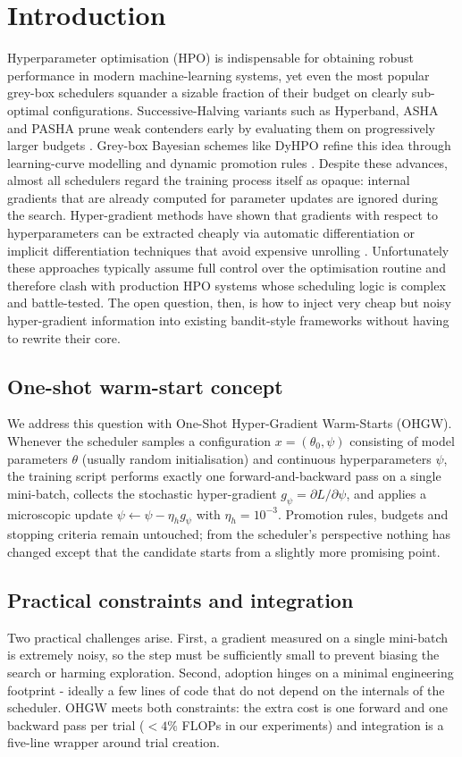 \documentclass{article}
\begin{document}
\section{Introduction}
Hyperparameter optimisation (HPO) is indispensable for obtaining robust performance in modern machine-learning systems, yet even the most popular grey-box schedulers squander a sizable fraction of their budget on clearly sub-optimal configurations. Successive-Halving variants such as Hyperband, ASHA and PASHA prune weak contenders early by evaluating them on progressively larger budgets \cite{bohdal-2022-pasha}. Grey-box Bayesian schemes like DyHPO refine this idea through learning-curve modelling and dynamic promotion rules \cite{wistuba-2022-supervising}. Despite these advances, almost all schedulers regard the training process itself as opaque: internal gradients that are already computed for parameter updates are ignored during the search. Hyper-gradient methods have shown that gradients with respect to hyperparameters can be extracted cheaply via automatic differentiation \cite{chandra-2019-gradient} or implicit differentiation techniques that avoid expensive unrolling \cite{bertrand-2020-implicit}. Unfortunately these approaches typically assume full control over the optimisation routine and therefore clash with production HPO systems whose scheduling logic is complex and battle-tested. The open question, then, is how to inject very cheap but noisy hyper-gradient information into existing bandit-style frameworks without having to rewrite their core.

\subsection{One-shot warm-start concept}
We address this question with One-Shot Hyper-Gradient Warm-Starts (OHGW). Whenever the scheduler samples a configuration $x=(\theta_0, \psi)$ consisting of model parameters $\theta$ (usually random initialisation) and continuous hyperparameters $\psi$, the training script performs exactly one forward-and-backward pass on a single mini-batch, collects the stochastic hyper-gradient $g_\psi = \partial L/\partial \psi$, and applies a microscopic update $\psi \leftarrow \psi - \eta_h g_\psi$ with $\eta_h = 10^{-3}$. Promotion rules, budgets and stopping criteria remain untouched; from the scheduler's perspective nothing has changed except that the candidate starts from a slightly more promising point.

\subsection{Practical constraints and integration}
Two practical challenges arise. First, a gradient measured on a single mini-batch is extremely noisy, so the step must be sufficiently small to prevent biasing the search or harming exploration. Second, adoption hinges on a minimal engineering footprint - ideally a few lines of code that do not depend on the internals of the scheduler. OHGW meets both constraints: the extra cost is one forward and one backward pass per trial ($<4 \%$ FLOPs in our experiments) and integration is a five-line wrapper around trial creation.
\end{document}

